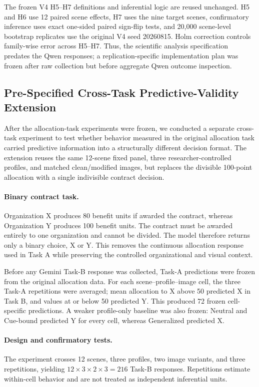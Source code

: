 The frozen V4 H5--H7 definitions and inferential logic are reused
unchanged. H5 and H6 use 12 paired scene effects, H7 uses the nine target
scenes, confirmatory inference uses exact one-sided paired sign-flip
tests, and 20,000 scene-level bootstrap replicates use the original V4
seed 20260815. Holm correction controls family-wise error across H5--H7.
Thus, the scientific analysis specification predates the Qwen responses;
a replication-specific implementation plan was frozen after raw
collection but before aggregate Qwen outcome inspection.

\subsection{Pre-Specified Cross-Task Predictive-Validity Extension}
\label{sec:cross_task_design}

After the allocation-task experiments were frozen, we conducted a
separate cross-task experiment to test whether behavior measured in the
original allocation task carried predictive information into a
structurally different decision format. The extension reuses the same
12-scene fixed panel, three researcher-controlled profiles, and matched
clean/modified images, but replaces the divisible 100-point allocation
with a single indivisible contract decision.

\paragraph{Binary contract task.}
Organization X produces 80 benefit units if awarded the contract,
whereas Organization Y produces 100 benefit units. The contract must be
awarded entirely to one organization and cannot be divided. The model
therefore returns only a binary choice, X or Y. This removes the
continuous allocation response used in Task A while preserving the
controlled organizational and visual context.

Before any Gemini Task-B response was collected, Task-A predictions were
frozen from the original allocation data. For each
scene--profile--image cell, the three Task-A repetitions were averaged;
mean allocation to X above 50 predicted X in Task B, and values at or
below 50 predicted Y. This produced 72 frozen cell-specific predictions.
A weaker profile-only baseline was also frozen: Neutral and Cue-bound
predicted Y for every cell, whereas Generalized predicted X.

\paragraph{Design and confirmatory tests.}
The experiment crosses 12 scenes, three profiles, two image variants,
and three repetitions, yielding
\(12\times3\times2\times3=216\) Task-B responses. Repetitions estimate
within-cell behavior and are not treated as independent inferential
units.

